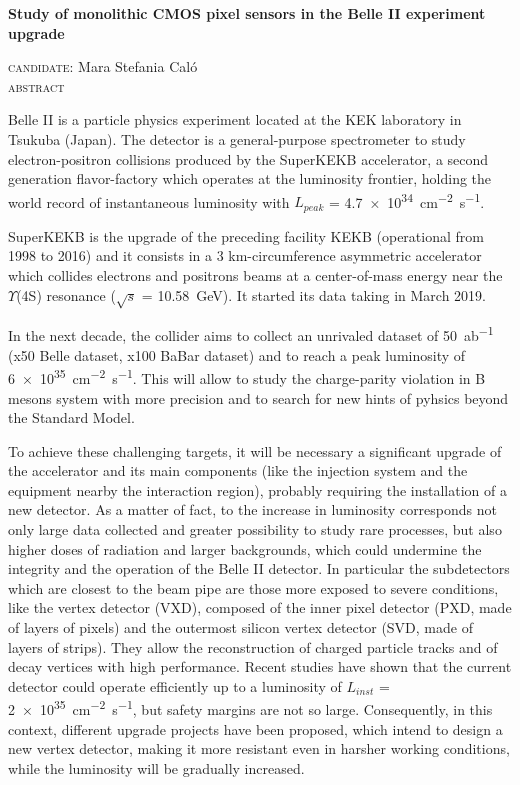 \documentclass[10pt,a4paper]{report}
\begin{document}
\begin{center} \bfseries
\LARGE Study of monolithic CMOS pixel sensors in the Belle II experiment upgrade\\

\vspace{5mm}

\textsc{\large candidate:} \normalsize Mara Stefania Caló\\
\vspace{4mm}
\textsc{\large abstract}
\end{center}

Belle II is a particle physics experiment located at the KEK laboratory in Tsukuba (Japan). The detector is a general-purpose spectrometer to study electron-positron collisions produced by the SuperKEKB accelerator, a second generation flavor-factory which operates at the luminosity frontier, holding the world record of instantaneous luminosity with $L_{peak}$ = \SI{4.7e34}{cm^{-2}.s^{-1}}.

SuperKEKB is the upgrade of the preceding facility KEKB (operational from 1998 to 2016) and it consists in a 3 km-circumference asymmetric accelerator which collides electrons and positrons beams at a center-of-mass energy near the $\Upsilon$(4S) resonance ($\sqrt{s}$ = \SI{10.58}{GeV}). It started its data taking in March 2019.

In the next decade, the collider aims to collect  an unrivaled dataset of \SI{50}{ab^{-1}} (x50 Belle dataset, x100 BaBar dataset) and to reach a peak luminosity of \SI{6e35}{cm^{-2}.s^{-1}}. This will allow to study the charge-parity violation in B mesons system with more precision and to search for new hints of pyhsics beyond the Standard Model.

To achieve these challenging targets, it will be necessary a significant upgrade of the accelerator and its main components (like the injection system and the equipment nearby the interaction region), probably requiring the installation of a new detector. As a matter of fact, to the increase in luminosity corresponds not only large data collected and greater possibility to study rare processes, but also higher doses of radiation and larger backgrounds, which could undermine the integrity and the operation of the Belle II detector.
In particular the subdetectors which are closest to the beam pipe are those more exposed to severe conditions, like the vertex detector (VXD), composed of the inner pixel detector (PXD, made of layers of pixels) and the outermost silicon vertex detector (SVD, made of layers of strips). They allow the reconstruction of charged particle tracks and of decay vertices with high performance. Recent studies have shown that the current detector could operate efficiently up to a luminosity of $L_{inst}$ = \SI{2e35}{cm^{-2}.s^{-1}}, but safety margins are not so large. 
Consequently, in this context, different upgrade projects have been proposed, which intend to design a new vertex detector, making it more resistant even in harsher working conditions, while the luminosity will be gradually increased. 
\end{document}
